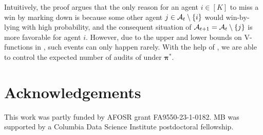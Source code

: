 Intuitively, the proof argues that the only reason for an agent $i\in [K]$ to miss a win by marking down is because some other agent $j\in \mathcal{A}_t\setminus \{i\}$ would win-by-lying with high probability, and the consequent situation of $\mathcal{A}_{t+1}=\mathcal{A}_t\setminus \{j\}$ is more favorable for agent $i$. However, due to the upper and lower bounds on V-functions in , such events can only happen rarely. With the help of , we are able to control the expected number of audits of \mechname under $\bm\pi^\ast$.


\section*{Acknowledgements}

This work was partly funded by AFOSR grant FA9550-23-1-0182. MB was supported by a Columbia Data Science Institute postdoctoral fellowship.